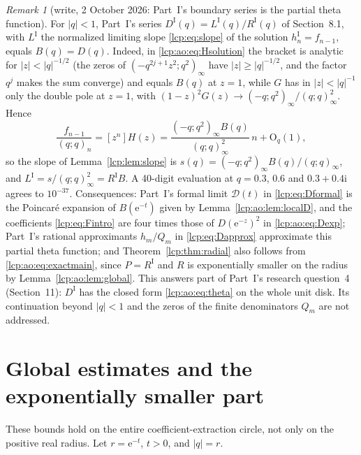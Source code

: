 \documentclass[11pt]{article}
\numberwithin{equation}{section}
\theoremstyle{definition}\newtheorem{definition}[theorem]{Definition}
\theoremstyle{remark}\newtheorem{remark}[theorem]{Remark}
\newcommand{\OO}{\mathrm O}
\newcommand{\ee}{\mathrm e}
\newcommand{\ii}{\mathrm i}%
\begin{document}
\begin{remark}[write, 2 October 2026: Part~I's boundary series is the partial theta function]\label{lcp:ao:rem:LR}
For $|q|<1$, Part~I's series $D^{\mathrm I}(q)=L^{\mathrm I}(q)/R^{\mathrm I}(q)$
of Section~8.1, with $L^{\mathrm I}$ the normalized limiting slope
\eqref{lcp:eq:slope} of the solution $h^{\mathrm I}_n=f_{n-1}$, equals
$B(q)=D(q)$. Indeed, in \eqref{lcp:ao:eq:Hsolution} the bracket is
analytic for $|z|<|q|^{-1/2}$ (the zeros of $(-q^{2j+1}z^2;q^2)_\infty$
have $|z|\ge|q|^{-1/2}$, and the factor $q^j$ makes the sum converge) and
equals $B(q)$ at $z=1$, while $G$ has in $|z|<|q|^{-1}$ only the double
pole at $z=1$, with $(1-z)^2G(z)\to(-q;q^2)_\infty/(q;q)_\infty^2$. Hence
\[
 \frac{f_{n-1}}{(q;q)_n}=[z^n]H(z)
 =\frac{(-q;q^2)_\infty B(q)}{(q;q)_\infty^2}\,n+\OO_q(1),
\]
so the slope of Lemma~\ref{lcp:lem:slope} is
$s(q)=(-q;q^2)_\infty B(q)/(q;q)_\infty$, and
$L^{\mathrm I}=s/(q;q)_\infty^2=R^{\mathrm I}B$. A 40-digit evaluation at
$q=0.3$, $0.6$ and $0.3+0.4\ii$ agrees to $10^{-37}$. Consequences: Part~I's
formal limit $\mathcal D(t)$ in \eqref{lcp:eq:Dformal} is the Poincar\'e
expansion of $B(\ee^{-t})$ given by Lemma~\ref{lcp:ao:lem:localD}, and the
coefficients \eqref{lcp:eq:Fintro} are four times those of $D(\ee^{-z})^2$
in \eqref{lcp:ao:eq:Dexp}; Part~I's rational approximants $h_m/Q_m$ in
\eqref{lcp:eq:Dapprox} approximate this partial theta function; and
Theorem~\ref{lcp:thm:radial} also follows from \eqref{lcp:ao:eq:exactmain},
since $P=R^{\mathrm I}$ and $R$ is exponentially smaller on the radius by
Lemma~\ref{lcp:ao:lem:global}. This answers part of Part~I's research
question~4 (Section~11): $D^{\mathrm I}$ has the closed form
\eqref{lcp:ao:eq:theta} on the whole unit disk. Its continuation beyond
$|q|<1$ and the zeros of the finite denominators $Q_m$ are not addressed.
\end{remark}

\section{Global estimates and the exponentially smaller part}\label{lcp:ao:sec:global}
These bounds hold on the entire coefficient-extraction circle, not only on the positive real radius. Let $r=\ee^{-t}$, $t>0$, and $|q|=r$.
\end{document}
